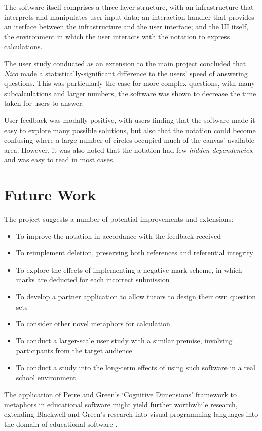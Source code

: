 \documentclass[12pt,twoside,notitlepage,xetex]{report}
\begin{document}
The software itself comprises a three-layer structure, with an infrastructure that interprets and manipulates user-input data; an interaction handler that provides an iterface between the infrastructure and the user interface; and the UI itself, the environment in which the user interacts with the notation to express calculations.

The user study conducted as an extension to the main project concluded that \emph{Nico} made a statistically-significant difference to the users' speed of answering questions.  This was particularly the case for more complex questions, with many subcalculations and larger numbers, the software was shown to decrease the time taken for users to answer.

User feedback was modally positive, with users finding that the software made it easy to explore many possible solutions, but also that the notation could become confusing where a large number of circles occupied much of the canvas' available area.  However, it was also noted that the notation had few \emph{hidden dependencies}, and was easy to read in most cases.

\section{Future Work}

The project suggests a number of potential improvements and extensions:
\begin{itemize}
\item To improve the notation in accordance with the feedback received
\item To reimplement deletion, preserving both references and referential integrity
\item To explore the effects of implementing a negative mark scheme, in which marks are deducted for each incorrect submission
\item To develop a partner application to allow tutors to design their own question sets
\item To consider other novel metaphors for calculation
\item To conduct a larger-scale user study with a similar premise, involving participants from the target audience
\item To conduct a study into the long-term effects of using such software in a real school environment
\end{itemize}

The application of Petre and Green's `Cognitive Dimensions' framework to metaphors in educational software might yield further worthwhile research, extending Blackwell and Green's research into visual programming languages into the domain of educational software \cite{Green1996} \cite{Blackwell1999}.
\end{document}

